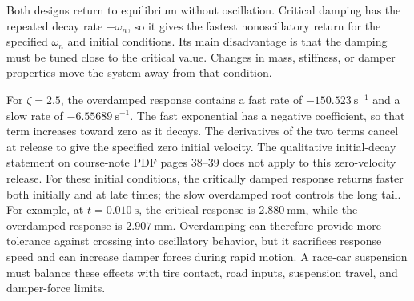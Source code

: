 Both designs return to equilibrium without oscillation. Critical damping has the repeated decay rate $-\omega_n$, so it gives the fastest nonoscillatory return for the specified $\omega_n$ and initial conditions. Its main disadvantage is that the damping must be tuned close to the critical value. Changes in mass, stiffness, or damper properties move the system away from that condition.

For $\zeta=2.5$, the overdamped response contains a fast rate of $-150.523\ \mathrm{s^{-1}}$ and a slow rate of $-6.55689\ \mathrm{s^{-1}}$. The fast exponential has a negative coefficient, so that term increases toward zero as it decays. The derivatives of the two terms cancel at release to give the specified zero initial velocity. The qualitative initial-decay statement on course-note PDF pages 38--39 does not apply to this zero-velocity release. For these initial conditions, the critically damped response returns faster both initially and at late times; the slow overdamped root controls the long tail. For example, at \(t=0.010\ \mathrm{s}\), the critical response is \(2.880\ \mathrm{mm}\), while the overdamped response is \(2.907\ \mathrm{mm}\). Overdamping can therefore provide more tolerance against crossing into oscillatory behavior, but it sacrifices response speed and can increase damper forces during rapid motion. A race-car suspension must balance these effects with tire contact, road inputs, suspension travel, and damper-force limits.

\clearpage
{}



\endgroup

